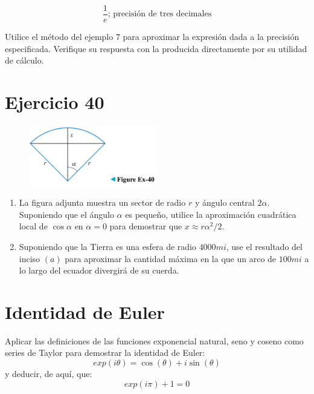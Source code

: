 \documentclass[12pt]{article}
\begin{document}
\[\frac{1}{e}\text{; precisión de tres decimales}\]

Utilice el método del ejemplo 7 para aproximar la expresión dada a la precisión especificada. Verifique su respuesta con la producida directamente por su utilidad de cálculo.

\section{Ejercicio 40}

\begin{figure}[h!]
\centering
\includegraphics[width=0.5\textwidth]{../img/img_Lista2/2_40.png}
\end{figure}
\begin{enumerate}[label=(\alph*)]
\item La figura adjunta muestra un sector de radio $r$ y ángulo central $2 \alpha$. Suponiendo que el ángulo $\alpha$ es pequeño, utilice la aproximación cuadrática local de $\cos \alpha$ en $\alpha = 0$ para demostrar que $x \approx r \alpha ^2/2$.
\item Suponiendo que la Tierra es una esfera de radio $4000 mi$, use el resultado del inciso $(a)$ para aproximar la cantidad máxima en la que un arco de $100 mi$ a lo largo del ecuador divergirá de su cuerda.
\end{enumerate}

\section{Identidad de Euler}

Aplicar las definiciones de las funciones exponencial natural, seno y coseno como series de Taylor para demostrar la identidad de Euler:
\[exp(i\theta) = \cos(\theta) + i \sin(\theta)\]
y deducir, de aquí, que:
\[exp(i\pi) + 1 = 0\]
\end{document}
